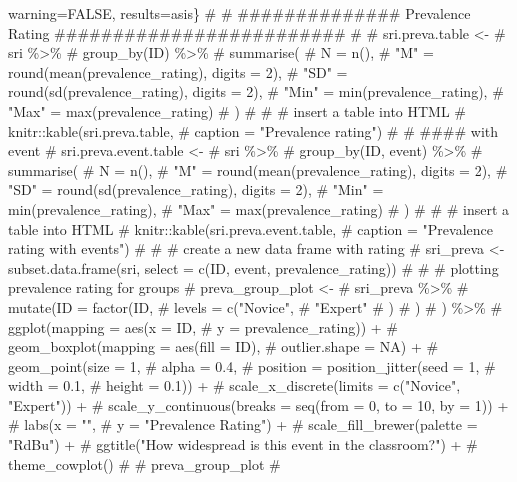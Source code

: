 \documentclass[
]{article}
\begin{document}
warning=FALSE, results=\textquotesingle asis\textquotesingle\} \#  \# \#\#\#\#\#\#\#\#\#\#\#\#\#\# Prevalence Rating \#\#\#\#\#\#\#\#\#\#\#\#\#\#\#\#\#\#\#\#\#\#\#\#\# \#  \# sri.preva.table \textless- \#   sri \%\textgreater\% \#   group\_by(ID) \%\textgreater\% \#   summarise( \#     N = n(), \#     "M" = round(mean(prevalence\_rating), digits = 2), \#     "SD" = round(sd(prevalence\_rating), digits = 2), \#     "Min" = min(prevalence\_rating), \#     "Max" = max(prevalence\_rating) \#   ) \#  \# \# insert a table into HTML \# knitr::kable(sri.preva.table, \#              caption = "Prevalence rating") \#  \# \#\#\#\# with event  \# sri.preva.event.table \textless- \#   sri \%\textgreater\% \#   group\_by(ID, event) \%\textgreater\% \#   summarise( \#     N = n(), \#     "M" = round(mean(prevalence\_rating), digits = 2), \#     "SD" = round(sd(prevalence\_rating), digits = 2), \#     "Min" = min(prevalence\_rating), \#     "Max" = max(prevalence\_rating) \#   ) \#  \# \# insert a table into HTML \# knitr::kable(sri.preva.event.table, \#              caption = "Prevalence rating with events") \#  \# \# create a new data frame with rating \# sri\_preva \textless- subset.data.frame(sri, select = c(ID, event, prevalence\_rating)) \#  \# \# plotting prevalence rating for groups \# preva\_group\_plot \textless-  \#   sri\_preva \%\textgreater\%  \#   mutate(ID = factor(ID, \#                      levels = c("Novice", \#                                 "Expert" \#                                 ) \#                      ) \#          ) \%\textgreater\%  \#   ggplot(mapping = aes(x = ID, \#                        y = prevalence\_rating)) + \#   geom\_boxplot(mapping = aes(fill = ID), \#                outlier.shape = NA) + \#   geom\_point(size = 1, \#              alpha = 0.4, \#              position = position\_jitter(seed = 1, \#                                         width = 0.1, \#                                         height = 0.1)) + \#   scale\_x\_discrete(limits = c("Novice", "Expert")) + \#   scale\_y\_continuous(breaks = seq(from = 0, to = 10, by = 1)) +  \#   labs(x = "", \#        y = "Prevalence Rating") +  \#   scale\_fill\_brewer(palette  = "RdBu") +   \#   ggtitle("How widespread is this event in the classroom?") + \#   theme\_cowplot() \#  \# preva\_group\_plot \#  
\end{document}
